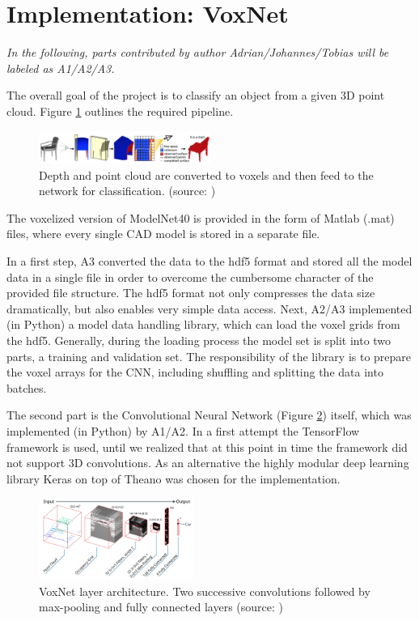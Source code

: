 \documentclass[10pt,twocolumn,letterpaper]{article}
\begin{document}
\section{Implementation: VoxNet \cite{voxnet}}

\textit{In the following, parts contributed by author Adrian/Johannes/Tobias will be labeled 
as A1/A2/A3.}\newline

The overall goal of the project is to classify an object from a given 3D point cloud. Figure \ref{fig:algo} outlines 
the required pipeline.

\begin{figure}[h]
	\label{fig:algo}
	\centering
	\includegraphics[width=0.5\textwidth]{figures/algo}
	\caption{ Depth and point cloud are converted to voxels and then feed to the network 
	for classification. (source: \cite{shape})}
\end{figure}

The voxelized version of ModelNet40 is provided in the form of Matlab (.mat) files, where every single CAD model is stored 
in a separate file.

In a first step, A3 converted the data to the hdf5 format and stored all the model data in a single file in order to overcome 
the cumbersome character of the provided file structure. The hdf5 format not only compresses the data size dramatically, but also enables
very simple data access. 
Next, A2/A3 implemented (in Python) a model data handling library, which can load the voxel grids from the hdf5. Generally, during the loading 
process the model set is split into two parts, a training and validation set. The responsibility of the library is to prepare 
the voxel arrays for the CNN, including shuffling and splitting the data into batches.

The second part is the Convolutional Neural Network (Figure \ref{fig:voxnet_structure}) itself, which was implemented (in Python) by A1/A2.
In a first attempt the TensorFlow framework is used, until we realized that at this point in time the framework 
did not support 3D convolutions. As an alternative the highly modular deep learning library Keras on top of Theano
was chosen for the implementation.

\begin{figure}[h]
	\label{fig:voxnet_structure}
	\centering
	\includegraphics[width=0.45\textwidth]{figures/model}
	\caption{VoxNet layer architecture. Two successive convolutions followed by 
	max-pooling and fully connected layers (source: \cite{mature})}
\end{figure}
\end{document}

